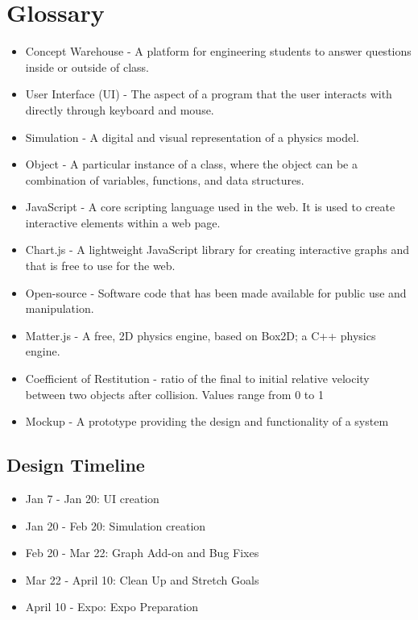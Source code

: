 \section{Glossary}
\begin{itemize}
  \item Concept Warehouse - A platform for engineering students to answer questions inside or outside of class.
  \item User Interface (UI) - The aspect of a program that the user interacts with directly through keyboard and mouse.
  \item Simulation - A digital and visual representation of a physics model.
  \item Object - A particular instance of a class, where the object can be a combination of variables, functions, and data structures.
  \item JavaScript - A core scripting language used in the web. It is used to create interactive elements within a web page.
  \item Chart.js - A lightweight JavaScript library for creating interactive graphs and that is free to use for the web.
  \item Open-source - Software code that has been made available for public use and manipulation.
  \item Matter.js - A free, 2D physics engine, based on Box2D; a C++ physics engine.
  \item Coefficient of Restitution - ratio of the final to initial relative velocity between two objects after collision. Values range from 0 to 1
  \item Mockup - A prototype providing the design and functionality of a system 
\end{itemize} 

\subsection{Design Timeline}
\begin{itemize}
    \item Jan 7 - Jan 20: UI creation
    \item Jan 20 - Feb 20: Simulation creation
    \item Feb 20 - Mar 22: Graph Add-on and Bug Fixes
    \item Mar 22 - April 10: Clean Up and Stretch Goals
    \item April 10 - Expo: Expo Preparation
\end{itemize}

